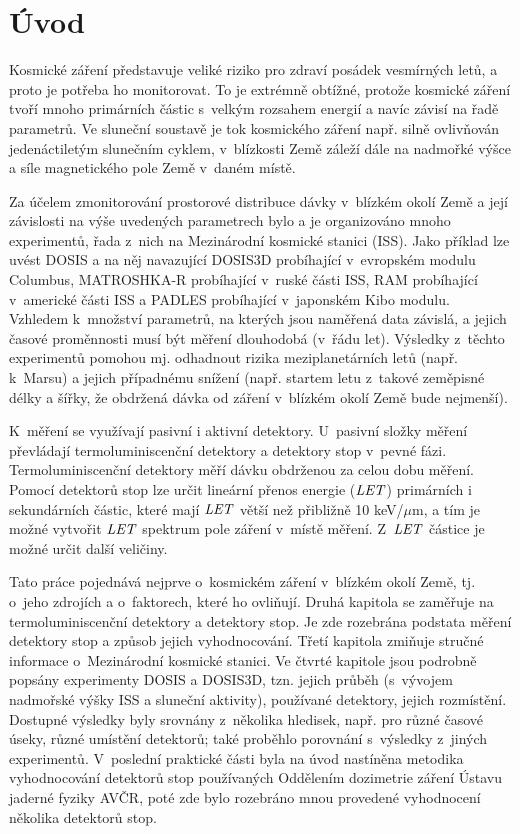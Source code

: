 \chapter*{Úvod}
\markboth{}{}
Kosmické záření představuje veliké riziko pro zdraví posádek vesmírných letů, a proto je potřeba ho monitorovat. To je extrémně obtížné, protože kosmické záření tvoří mnoho primárních částic s~velkým rozsahem energií a navíc závisí na řadě parametrů. Ve sluneční soustavě je tok kosmického záření např. silně ovlivňován jedenáctiletým slunečním cyklem, v~blízkosti Země záleží dále na nadmořké výšce a síle magnetického pole Země v~daném místě. 

Za účelem zmonitorování prostorové distribuce dávky v~blízkém okolí Země a její závislosti na výše uvedených parametrech bylo a je organizováno mnoho experimentů, řada z~nich na Mezinárodní kosmické stanici (ISS). Jako příklad lze uvést DOSIS a na něj navazující DOSIS3D probíhající v~evropském modulu Columbus, MATROSHKA-R probíhající v~ruské části ISS, RAM probíhající v~americké části ISS a PADLES probíhající v~japonském Kibo modulu. Vzhledem k~množství parametrů, na kterých jsou naměřená data závislá, a jejich časové proměnnosti musí být měření dlouhodobá (v~řádu let). Výsledky z~těchto experimentů pomohou mj. odhadnout rizika meziplanetárních letů (např. k~Marsu) a jejich případnému snížení (např. startem letu z~takové zeměpisné délky a šířky, že obdržená dávka od záření v~blízkém okolí Země bude nejmenší). 

K~měření se využívají pasivní i aktivní detektory. U~pasivní složky měření převládají termoluminiscenční detektory a detektory stop v~pevné fázi. Termoluminiscenční detektory měří dávku obdrženou za celou dobu měření. Pomocí detektorů stop lze určit lineární přenos energie ($\mathit{LET}$) primárních i sekundárních částic, které mají $\mathit{LET}$ větší než přibližně 10 keV/$\mu$m, a tím je možné vytvořit $\mathit{LET}$ spektrum pole záření v~místě měření. Z~$\mathit{LET}$ částice je možné určit další veličiny.

Tato práce pojednává nejprve o~kosmickém záření v~blízkém okolí Země, tj. o~jeho zdrojích a o~faktorech, které ho ovliňují. Druhá kapitola se zaměřuje na termoluminiscenční detektory a detektory stop. Je zde rozebrána podstata měření detektory stop a způsob jejich vyhodnocování. Třetí kapitola zmiňuje stručné informace o~Mezinárodní kosmické stanici. Ve čtvrté kapitole jsou podrobně popsány experimenty DOSIS a DOSIS3D, tzn. jejich průběh (s~vývojem nadmořské výšky ISS a sluneční aktivity), používané detektory, jejich rozmístění. Dostupné výsledky byly srovnány z~několika hledisek, např. pro různé časové úseky, různé umístění detektorů; také proběhlo porovnání s~výsledky
z~jiných experimentů. V~poslední praktické části byla na úvod nastíněna metodika vyhodnocování detektorů stop používaných Oddělením dozimetrie záření Ústavu jaderné fyziky AVČR, poté zde bylo rozebráno mnou provedené vyhodnocení několika detektorů stop.
